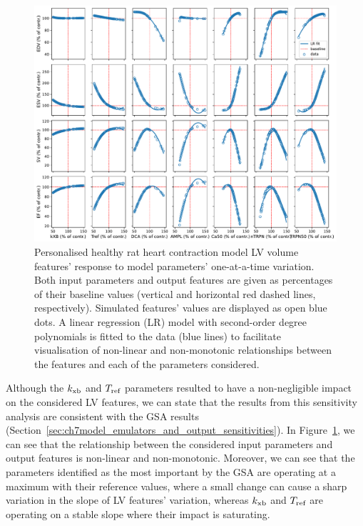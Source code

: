 \begin{figure}[ht!]
    \myfloatalign
    \includegraphics[width=\textwidth]{figures/chapter07/Figure_oneatatime_thesis.pdf}
    \caption{Personalised healthy rat heart contraction model LV volume features' response to model parameters' one-at-a-time variation. Both input parameters and output features are given as percentages of their baseline values (vertical and horizontal red dashed lines, respectively). Simulated features' values are displayed as open blue dots. A linear regression (LR) model with second-order degree polynomials is fitted to the data (blue lines) to facilitate visualisation of non-linear and non-monotonic relationships between the features and each of the parameters considered.}
    \label{fig:oat}
\end{figure}

\vspace{0.2cm}\noindent
Although the $k_{\textrm{xb}}$ and $T_{\textrm{ref}}$ parameters resulted to have a non-negligible impact on the considered LV features, we can state that the results from this sensitivity analysis are consistent with the GSA results (Section~\ref{sec:ch7model_emulators_and_output_sensitivities}). In Figure~\ref{fig:oat}, we can see that the relationship between the considered input parameters and output features is non-linear and non-monotonic. Moreover, we can see that the parameters identified as the most important by the GSA are operating at a maximum with their reference values, where a small change can cause a sharp variation in the slope of LV features' variation, whereas $k_{\textrm{xb}}$ and $T_{\textrm{ref}}$ are operating on a stable slope where their impact is saturating.

